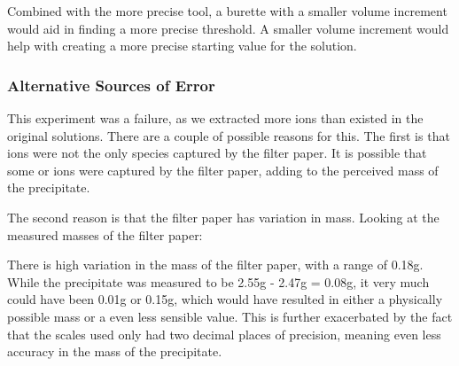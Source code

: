Combined with the more precise tool, a burette with a smaller volume increment would aid in finding a more precise threshold. A smaller volume increment would help with creating a more precise starting value for the  solution.

\subsubsection{Alternative Sources of Error}
This experiment was a failure, as we extracted more ions than existed in the original solutions. There are a couple of possible reasons for this.
The first is that  ions were not the only species captured by the filter paper. It is possible that some  or  ions were captured by the filter paper, adding to the perceived mass of the precipitate.

The second reason is that the filter paper has variation in mass. Looking at the measured masses of the filter paper:
\begin{table}[H]
        \centering
        \caption{Alternative Data (averages).}
        
        \vspace{0.5em}
        
        {
            \aboverulesep=0pt
            \belowrulesep=0pt
        }
\end{table}

There is high variation in the mass of the filter paper, with a range of 0.18g. While the precipitate was measured to be 2.55g - 2.47g = 0.08g, it very much could have been 0.01g or 0.15g, which would have resulted in either a physically possible mass or a even less sensible value. This is further exacerbated by the fact that the scales used only had two decimal places of precision, meaning even less accuracy in the mass of the precipitate.